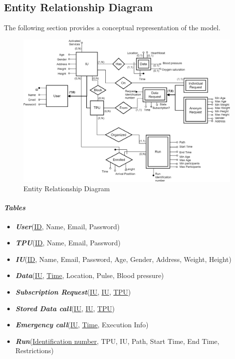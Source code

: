 \subsection{Entity Relationship Diagram}
The following section provides a conceptual representation of the model.
\begin{figure}[H]
\caption{Entity Relationship Diagram}
\centering
\includegraphics[width = \textwidth]{sections/architecturalDesign/entityRelationshipDiagram.png}
\end{figure}
\paragraph{\textit{Tables}} 
\begin{itemize}
\item \textbf{\textit{User}}(\underline{ID}, Name, Email, Password)
\item \textbf{\textit{TPU}}(\underline{ID}, Name, Email, Password)
\item \textbf{\textit{IU}}(\underline{ID}, Name, Email, Password, Age, Gender, Address, Weight, Height)
\item \textbf{\textit{Data}}(\underline{IU}, \underline{Time}, Location, Pulse, Blood pressure)
\\
\item \textbf{\textit{Subscription Request}}(\underline{IU}, \underline{IU}, \underline{TPU})
\item \textbf{\textit{Stored Data call}}(\underline{IU}, \underline{IU}, \underline{TPU})
\\
\item \textbf{\textit{Emergency call}}(\underline{IU}, \underline{Time}, Execution Info)
\\
\item \textbf{\textit{Run}}(\underline{Identification number}, TPU, IU, Path, Start Time, End Time, Restrictions)
\end{itemize}
